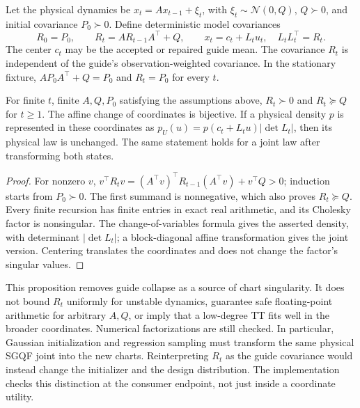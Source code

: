 Let the physical dynamics be $x_t=A x_{t-1}+\xi_t$, with
$\xi_t\sim\mathcal N(0,Q)$, $Q\succ0$, and initial covariance
$P_0\succ0$. Define deterministic model covariances
\begin{equation}
 R_0=P_0,\qquad R_t=A R_{t-1}A^\top+Q,\qquad
 x_t=c_t+L_t u_t,\quad L_tL_t^\top=R_t .
 \label{eq:robust-chart}
\end{equation}
The center $c_t$ may be the accepted or repaired guide mean. The covariance
$R_t$ is independent of the guide's observation-weighted covariance. In the
stationary fixture, $A P_0A^\top+Q=P_0$ and $R_t=P_0$ for every $t$.

\begin{proposition}
\label{prop:robust-chart}
For finite $t$, finite $A,Q,P_0$ satisfying the assumptions above,
$R_t\succ0$ and $R_t\succeq Q$ for $t\ge1$.
The affine change of coordinates is bijective. If a physical density $p$
is represented in these coordinates as
$p_U(u)=p(c_t+L_tu)|\det L_t|$, then its physical law is unchanged.
The same statement holds for a joint law after transforming both states.
\end{proposition}
\begin{proof}
For nonzero $v$,
$v^\top R_tv=(A^\top v)^\top R_{t-1}(A^\top v)+v^\top Q>0$;
induction starts from $P_0\succ0$. The first summand is nonnegative, which
also proves $R_t\succeq Q$. Every finite recursion has finite entries in
exact real arithmetic, and its Cholesky factor is nonsingular. The
change-of-variables formula gives the asserted density, with determinant
$|\det L_t|$; a block-diagonal affine transformation gives the joint
version. Centering translates the coordinates and does not change the
factor's singular values.
\end{proof}

This proposition removes guide collapse as a source of chart singularity.
It does not bound $R_t$ uniformly for unstable dynamics, guarantee safe
floating-point arithmetic for arbitrary $A,Q$, or imply that a low-degree
TT fits well in the broader coordinates. Numerical factorizations are still
checked. In particular, Gaussian initialization and regression sampling must
transform the same physical SGQF joint into the new charts. Reinterpreting
$R_t$ as the guide covariance would instead change the initializer and
the design distribution. The implementation checks this distinction at the
consumer endpoint, not just inside a coordinate utility.

